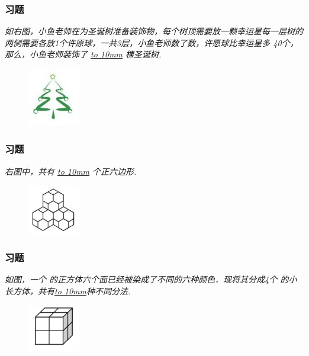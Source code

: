 \begin{frame}
    \frametitle{习题\theframecounter}
    \textit{如右图，小鱼老师在为圣诞树准备装饰物，每个树顶需要放一颗幸运星每一层树的两侧需要各放1个许原球，一共3层，小鱼老师数了数，许愿球比幸运星多 40个，那么，小鱼老师装饰了 \underline{\hbox to 10mm{}} 棵圣诞树.}
    \begin{figure}[H] 
        \centering
        \includegraphics[width=0.2\textwidth]{./pics/Chapter_6/13.png}
    \end{figure}
\end{frame}


\begin{frame}
    \frametitle{习题\theframecounter}
    \textit{右图中，共有 \underline{\hbox to 10mm{}} 个正六边形.}
    \begin{figure}[H] 
        \centering
        \includegraphics[width=0.2\textwidth]{./pics/Chapter_6/14.png}
    \end{figure}
\end{frame}

\begin{frame}
    \frametitle{习题\theframecounter}
    \textit{如图，一个 的正方体六个面已经被染成了不同的六种颜色．现将其分成4个 的小长方体，共有\underline{\hbox to 10mm{}}种不同分法.}
    \begin{figure}[H] 
        \centering
        \includegraphics[width=0.2\textwidth]{./pics/Chapter_6/15.png}
    \end{figure}
\end{frame}